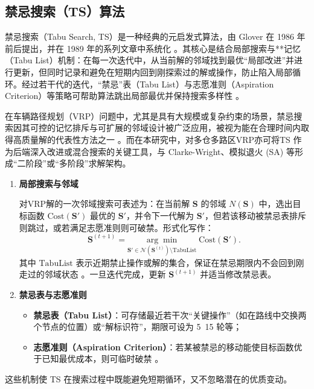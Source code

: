 \documentclass[12pt,a4paper,twoside]{ctexbook}
\begin{document}
\subsection{禁忌搜索（TS）算法}

禁忌搜索（Tabu Search, TS）是一种经典的元启发式算法，由 Glover 在 1986 年前后提出，并在 1989 年的系列文章中系统化 \cite{glover1986tabu}。其核心是结合局部搜索与**记忆（Tabu List）机制：在每一次迭代中，从当前解的邻域找到最优“局部改进”并进行更新，但同时记录和避免在短期内回到刚探索过的解或操作，防止陷入局部循环。经过若干代的迭代，“禁忌”表（Tabu List）与志愿准则（Aspiration Criterion）等策略可帮助算法跳出局部最优并保持搜索多样性 \cite{glover1989advances}。

在车辆路径规划（VRP）问题中，尤其是具有大规模或复杂约束的场景，禁忌搜索因其可控的记忆排斥与可扩展的邻域设计被广泛应用，被视为能在合理时间内取得高质量解的代表性方法之一 \cite{laporte2000tabu}。而在本研究中，对多仓多路区VRP亦可将TS 作为后端深入改进或混合搜索的关键工具，与 Clarke-Wright、模拟退火 (SA) 等形成“二阶段”或“多阶段”求解架构。
\begin{enumerate}
    \item \textbf{局部搜索与邻域}

    对VRP解的一次邻域搜索可表述为：在当前解 $\mathbf{S}$ 的邻域 $N(\mathbf{S})$ 中，选出目标函数 $\text{Cost}(\mathbf{S}')$ 最优的 $\mathbf{S}'$，并令下一代解为 $\mathbf{S}'$，但若该移动被禁忌表排斥则跳过，或若满足志愿准则则可破禁。形式化写作：
    \[
    \mathbf{S}^{(t+1)} = \underset{\mathbf{S}' \in \mathcal{N}(\mathbf{S}^{(t)}) \setminus \mathrm{TabuList}}{\arg\min}\; \mathrm{Cost}(\mathbf{S}').
    \]
    其中 $\mathrm{TabuList}$ 表示近期禁止操作或解的集合，保证在禁忌期限内不会回到刚走过的邻域状态 \cite{laporte2000tabu}。一旦迭代完成，更新 $\mathbf{S}^{(t+1)}$ 并适当修改禁忌表。

    \item \textbf{禁忌表与志愿准则}

    \begin{itemize}
        \item \textbf{禁忌表（Tabu List）}：可存储最近若干次“关键操作”（如在路线中交换两个节点的位置）或“解标识符”，期限可设为 5~15 轮等；
        \item \textbf{志愿准则（Aspiration Criterion）}：若某被禁忌的移动能使目标函数优于已知最优成本，则可临时破禁 \cite{glover1989tabu}。
    \end{itemize}
\end{enumerate}
    这些机制使 TS 在搜索过程中既能避免短期循环，又不忽略潜在的优质变动。
\end{document}
